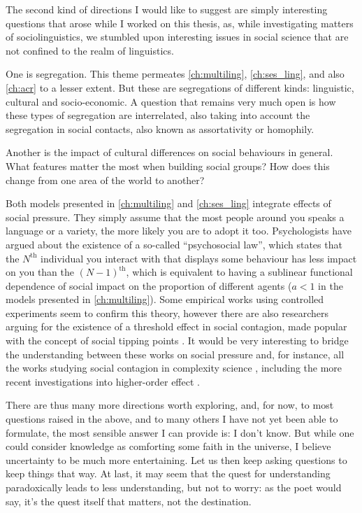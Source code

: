 \documentclass[../thesis.tex]{subfiles}
\begin{document}
The second kind of directions I would like to suggest are simply interesting questions
that arose while I worked on this thesis, as, while investigating matters of
sociolinguistics, we stumbled upon interesting issues in social science that are not
confined to the realm of linguistics.

One is segregation. This theme permeates \cref{ch:multiling},
\cref{ch:ses_ling}, and also \cref{ch:acr} to a lesser extent. But these are
segregations of different kinds: linguistic, cultural and socio-economic. A question
that remains very much open is how these types of segregation are interrelated, also
taking into account the segregation in social contacts, also known as assortativity or
homophily.

Another is the impact of cultural differences on social behaviours in general. What
features matter the most when building social groups? How does this change from one area
of the world to another?

Both models presented in \cref{ch:multiling} and \cref{ch:ses_ling} integrate effects of
social pressure. They simply assume that the most people around you speaks a language or
a variety, the more likely you are to adopt it too. Psychologists have argued about the
existence of a so-called ``psychosocial law'', which states that the $N^\text{th}$
individual you interact with that displays some behaviour has less impact on you than
the $(N - 1)^\text{th}$, which is equivalent to having a sublinear functional dependence
of social impact on the proportion of different agents ($a < 1$ in the models presented
in \cref{ch:multiling}). Some empirical works using controlled experiments seem to
confirm this theory, however there are also researchers arguing for the existence of a
threshold effect in social contagion, made popular with the concept of social tipping
points \cite{MilkoreitDefiningTipping2018}. It would be very interesting to bridge the
understanding between these works on social pressure and, for instance, all the works
studying social contagion in complexity science \cite{WattsInfluentialsNetworks2007},
including the more recent investigations into higher-order effect
\cite{IacopiniSimplicialModels2019}.

There are thus many more directions worth exploring, and, for now, to most questions
raised in the above, and to many others I have not yet been able to formulate, the most
sensible answer I can provide is: I don't know. But while one could consider knowledge
as comforting some faith in the universe, I believe uncertainty to be much more
entertaining. Let us then keep asking questions to keep things that way.
At last, it may seem that the quest for understanding paradoxically leads to less
understanding, but not to worry:
as the poet would say,
it's the quest itself that matters, not the destination.
\end{document}
